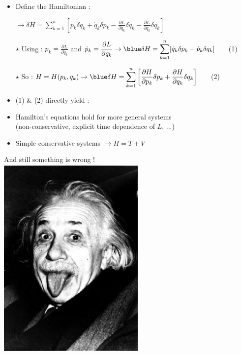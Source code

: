 \Tr
\begin{center}
{\red {}}
\end{center}
%
\begin{itemize}
\item Define the {\red Hamiltonian} :
 {\red {}}
\item[] $\rightarrow \delta H = {\displaystyle \sum_{k=1}^{n}
 \left[ p_{k}\delta\dot{q}_{k}+\dot{q}_{k}\delta p_{k}-
 \frac{\partial L}{\partial\dot{q}_{k}}\delta\dot{q}_{k}-
 \frac{\partial L}{\partial q_{k}}\delta q_{k} \right]}$
\item[$\star$] Using :
 $\displaystyle p_{k}=\frac{\partial L}{\partial \dot{q}_{k}}$ and
 $\displaystyle \dot{p}_{k}=\frac{\partial L}{\partial q_{k}}
 \rightarrow {\blue \delta H={\displaystyle \sum_{k=1}^{n}}
                    [\dot{q}_{k}\delta p_{k}-\dot{p}_{k}\delta q_{k}]}$ ~~~(1)
\item[$\star$] So : $H=H(p_{k},q_{k})
 \rightarrow {\blue \delta H={\displaystyle \sum_{k=1}^{n}
 \left[ \frac{\partial H}{\partial p_{k}}\delta p_{k}+
 \frac{\partial H}{\partial q_{k}}\delta q_{k} \right]}}$ ~~~(2)
\item (1) \& (2) directly yield :
{\red {}}
\end{itemize}

\Tr
\begin{itemize}
\item Hamilton's equations hold for more general systems\\
 (non-conservative, explicit time dependence of $L$, ...)
\item Simple conservative systems $\rightarrow H=T+V$
\end{itemize}
%
\begin{center}
{\blue And still something is wrong !}\\[1cm]
\includegraphics[keepaspectratio,height=10cm]{einstein}
\end{center}